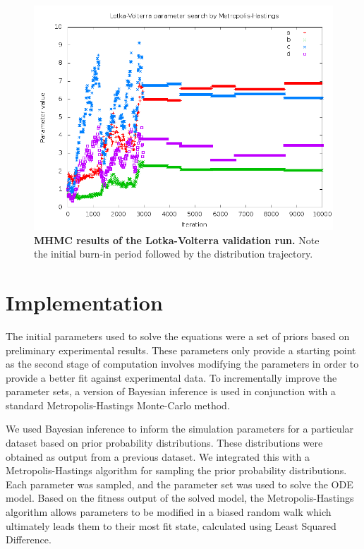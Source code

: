 \begin{figure}
 \centering
 \includegraphics[width=14cm]{./03-parameterestimationmethodologies/data/Parameters.png}
 \caption{{\bf MHMC results of the Lotka-Volterra validation run.} Note the initial burn-in period followed by the distribution trajectory.
 \label{fig:parameters}}
\end{figure}

\section{Implementation}
The initial parameters used to solve the equations were a set of priors based on preliminary experimental results. These parameters only provide a starting point as the second stage of computation involves modifying the parameters in order to provide a better fit against experimental data. To incrementally improve the parameter sets, a version of Bayesian inference is used in conjunction with a standard Metropolis-Hastings Monte-Carlo method.

We used Bayesian inference to inform the simulation parameters for a particular dataset based on prior probability distributions. These distributions were obtained as output from a previous dataset. We integrated this with a Metropolis-Hastings algorithm for sampling the prior probability distributions. Each parameter was sampled, and the parameter set was used to solve the ODE model. Based on the fitness output of the solved model, the Metropolis-Hastings algorithm allows parameters to be modified in a biased random walk which ultimately leads them to their most fit state, calculated using Least Squared Difference.

